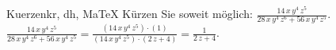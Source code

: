 \begin{MAufgabe}{Kuerzen}{kr, dh, MaTeX}
K\"urzen Sie soweit m\"oglich: $\frac{14\, x\, y^4\, z^5}{28\, x\, y^4\, z^6 + 56\, x\, y^4\, z^5}$.\\ 
\ifLsg\MLoesung
\quad $\frac{14\, x\, y^4\, z^5}{28\, x\, y^4\, z^6 + 56\, x\, y^4\, z^5}=\frac{(14\, x\, y^4\, z^5)\cdot(1)}{(14\, x\, y^4\, z^5)\cdot(2\, z + 4)}=\frac{1}{2\, z + 4}$.\else\relax\fi
 \end{MAufgabe}